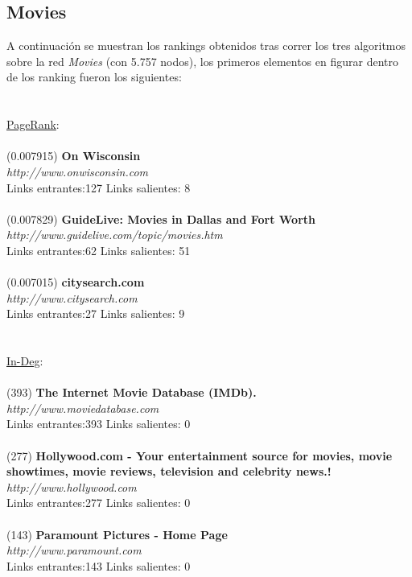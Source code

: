 \documentclass[a4paper]{article}
\begin{document}
\subsection*{Movies}
\indent A continuaci\'on se muestran los rankings obtenidos tras correr los tres algoritmos sobre la red \emph{Movies} (con 5.757 nodos), los primeros elementos en figurar dentro de los ranking fueron los siguientes: \\
\\
\\
\underline{PageRank}: \\
\\
(0.007915)\textbf{ On Wisconsin }\\
\textit{http://www.onwisconsin.com} \\
Links entrantes:127 \indent Links salientes: 8\\
\\
(0.007829) \textbf{GuideLive: Movies in Dallas and Fort Worth }\\
\textit{http://www.guidelive.com/topic/movies.htm} \\
Links entrantes:62 \indent Links salientes: 51\\
\\
(0.007015)\textbf{ citysearch.com} \\
\textit{http://www.citysearch.com }\\
Links entrantes:27 \indent Links salientes: 9\\
\\
\\
\underline{In-Deg}: \\
\\
(393)\textbf{ The Internet Movie Database (IMDb). }\\
\textit{http://www.moviedatabase.com }\\
Links entrantes:393 \indent Links salientes: 0\\
\\
(277) \textbf{Hollywood.com - Your entertainment source for movies, movie showtimes, movie reviews, television and celebrity news.!} \\
\textit{http://www.hollywood.com }\\
Links entrantes:277 \indent Links salientes: 0\\
\\
(143)\textbf{ Paramount Pictures - Home Page} \\
\textit{http://www.paramount.com }\\
Links entrantes:143 \indent Links salientes: 0\\
\end{document}
